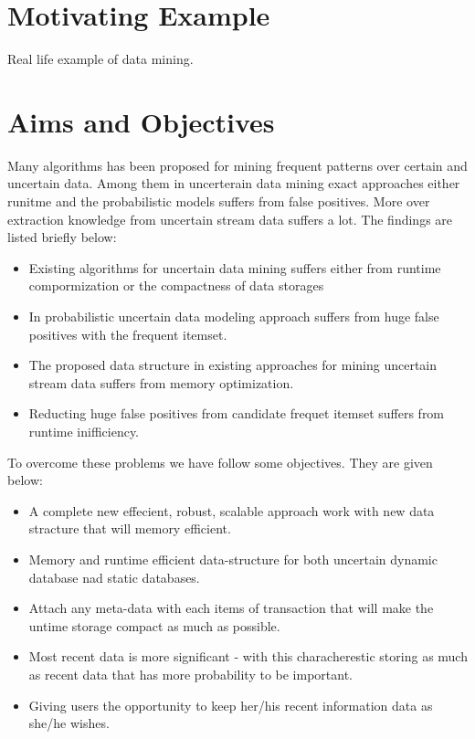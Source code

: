 \section{Motivating Example}
Real life example of data mining.


\section{Aims and Objectives}
Many algorithms has been proposed for mining frequent patterns over certain and uncertain data. Among them in uncerterain data mining exact approaches either runitme and the probabilistic models suffers from false positives. More over extraction knowledge from uncertain stream data suffers a lot. The findings are listed briefly below:
\begin{itemize}
	\item Existing algorithms for uncertain data mining suffers either from runtime compormization or the compactness of data storages
	\item In probabilistic uncertain data modeling approach suffers from huge false positives with the frequent itemset.
	\item The proposed data structure in existing approaches for mining uncertain stream data suffers from memory optimization.
	\item Reducting huge false positives from candidate frequet itemset suffers from runtime inifficiency.
\end{itemize}
To overcome these problems we have follow some objectives. They are given below:
\begin{itemize}
	\item A complete new effecient, robust, scalable approach work with new data stracture that will memory efficient.
	\item Memory and runtime efficient data-structure for both uncertain dynamic database nad static databases.
	\item Attach any meta-data with each items of transaction that will make the untime storage compact as much as possible.
	\item Most recent data is more significant - with this characherestic storing as much as recent data that has more probability to be important.
	\item Giving users the opportunity to keep her/his recent information data as she/he wishes.

\end{itemize}


